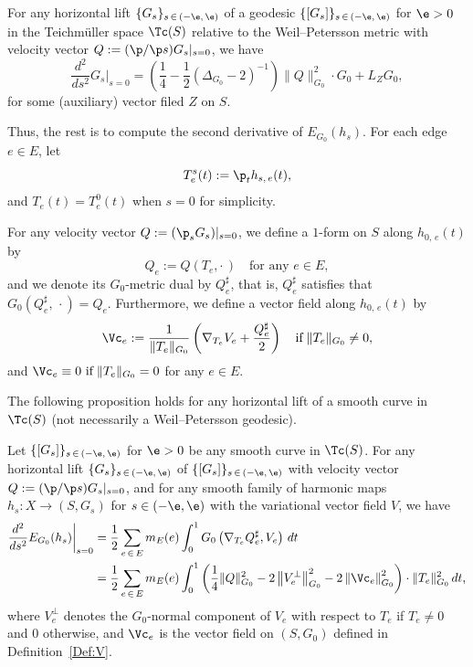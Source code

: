 \begin{prop}\label{key1}
For any horizontal lift $\{G_{s}\}_{s\,\in\,(-\e,\,\e)}$ of a geodesic $\{[G_{s}]\}_{s\,\in\,(-\e,\,\e)}$ for $\e>0$ in the Teichm\"uller space $\Tc(S)$ relative to the Weil--Petersson metric with velocity vector $Q:=(\p/\p s)G_s|_{s=0}$, we have
\[
\frac{d^2}{d s^2}G_{s}\bigg|_{s=0}=\left(\frac{1}{4}-\frac{1}{2}\left(\Delta_{G_0}-2\right)^{-1}\right)\|Q\|_{G_0}^2\cdot G_0 +L_{Z}G_0,
\]
for some (auxiliary) vector filed $Z$ on $S$.
\end{prop}


Thus, the rest is to compute the second derivative of ${E}_{G_0}(h_{s})$. For each edge $e\in E$, let
\[
T_e^s(t):=\p_th_{s,\,e}(t),
\]
and $T_e(t)=T_e^0(t)$ when $s=0$ for simplicity.


\begin{defi}\label{Def:V}
For any velocity vector $Q:=(\p_s G_s)|_{s=0}$, we define a $1$-form on $S$ along $h_{0, \,e}(t)$ by
\[
Q_e:=Q\left(T_e, \cdot\,\right) \quad \text{for any }e \in E,
\]
and we denote its $G_0$-metric dual by $Q_e^{\sharp}$, that is, $Q_e^{\sharp}$ satisfies that $G_0(Q_e^{\sharp},\,\cdot)=Q_e$. Furthermore, we define a vector field along $h_{0,\,e}(t)$ by
\begin{equation}\label{VW}
\Vc_e:=
\frac{1}{\|T_e\|_{G_0}}\left(\nabla_{T_e}V_e+\frac{Q_e^{\sharp}}{2}\right)\quad \text{if}\;\|T_e\|_{G_0}\neq 0,
\end{equation}
and $\Vc_e\equiv 0\ \text{if}\; \|T_e\|_{G_0}=0$ for any $e \in E$.
\end{defi}



The following proposition holds for any horizontal lift of a smooth curve in $\Tc(S)$ (not necessarily a Weil--Petersson geodesic).

\begin{prop}\label{key2}
Let $\{[G_s]\}_{s\,\in\,(-\e,\,\e)}$ for $\e>0$ be any smooth curve in $\Tc(S)$. For any horizontal lift $\{G_s\}_{s\,\in\,(-\e,\,\e)}$ of $\{[G_s]\}_{s\,\in\,(-\e,\,\e)}$ with velocity vector $Q:=(\p/\p s)\linebreak G_s|_{s=0}$, and for any smooth family of harmonic maps $h_{s}:X \to (S, G_s)$ for $s \in (-\e, \e)$ with the variational vector field $V$, we have
\begin{align*}
\frac{d^2}{d s^2}E_{G_0}(h_{s})\bigg|_{s=0}&=\frac{1}{2}\sum_{e\,\in\,E}m_E(e)\int_0^1G_0\left(\nabla_{T_e}Q_e^{\sharp}, V_e\right)\, dt\\
&=\frac{1}{2}\sum_{e\,\in\,E}m_E(e)\int_0^1\left(
\frac{1}{4}\|Q\|_{G_0}^2-2\left\|V_e^{\perp}\right\|_{G_0}^2-2\left\|\Vc_e\right\|_{G_0}^2
\right)\cdot \|T_e\|_{G_0}^2\,dt,
\end{align*}
where $V_e^{\perp}$ denotes the $G_0$-normal component of $V_e$ with respect to $T_e$ if $T_e \neq 0$ and $0$ otherwise, and $\Vc_e$ is the vector field on $(S, G_0)$ defined in Definition~\ref{Def:V}.
\end{prop}



